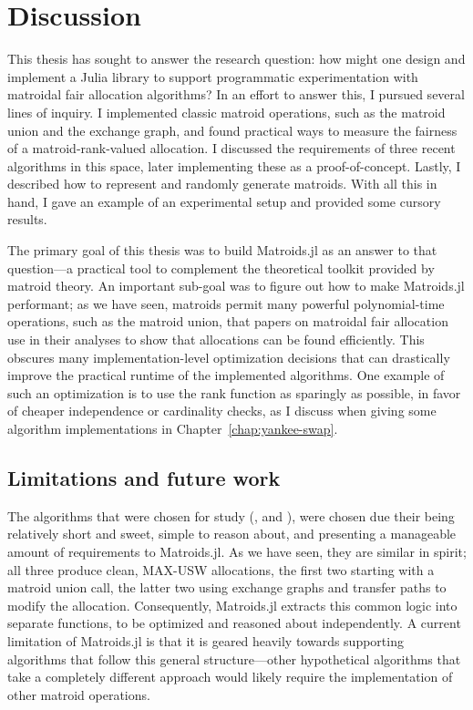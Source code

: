\chapter{Discussion}
\label{chap:conclusions}
This thesis has sought to answer the research question: how might one design and implement a Julia library to support programmatic experimentation with matroidal fair allocation algorithms? In an effort to answer this, I pursued several lines of inquiry. I implemented classic matroid operations, such as the matroid union and the exchange graph, and found practical ways to measure the fairness of a matroid-rank-valued allocation. I discussed the requirements of three recent algorithms in this space, later implementing these as a proof-of-concept. Lastly, I described how to represent and randomly generate matroids. With all this in hand, I gave an example of an experimental setup and provided some cursory results.

The primary goal of this thesis was to build Matroids.jl as an answer to that question---a practical tool to complement the theoretical toolkit provided by matroid theory. An important sub-goal was to figure out how to make Matroids.jl performant; as we have seen, matroids permit many powerful polynomial-time operations, such as the matroid union, that papers on matroidal fair allocation use in their analyses to show that allocations can be found efficiently. This obscures many implementation-level optimization decisions that can drastically improve the practical runtime of the implemented algorithms. One example of such an optimization is to use the rank function as sparingly as possible, in favor of cheaper independence or cardinality checks, as I discuss when giving some algorithm implementations in Chapter~\ref{chap:yankee-swap}.

\section{Limitations and future work}
The algorithms that were chosen for study (,  and ), were chosen due their being relatively short and sweet, simple to reason about, and presenting a manageable amount of requirements to Matroids.jl. As we have seen, they are similar in spirit; all three produce clean, MAX-USW allocations, the first two starting with a matroid union call, the latter two using exchange graphs and transfer paths to modify the allocation. Consequently, Matroids.jl extracts this common logic into separate functions, to be optimized and reasoned about independently. A current limitation of Matroids.jl is that it is geared heavily towards supporting algorithms that follow this general structure---other hypothetical algorithms that take a completely different approach would likely require the implementation of other matroid operations.

